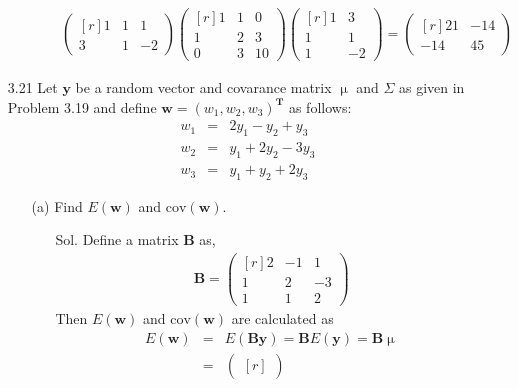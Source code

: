 \documentclass[12pt]{article} %
\begin{document}
\begin{enumerate}
\begin{enumerate}
\begin{enumerate}
\begin{eqnarray*}
\begin{pmatrix}[r]
				1 & 1 &  1 \\
				3 & 1 & 		  -2 		 	
		 	\end{pmatrix}		 		
			\begin{pmatrix}[r]
				1 & 1 & 0 \\
				1 & 2 & 3 \\
				0 & 3 & 10 
			\end{pmatrix}
			\begin{pmatrix}[r]
				1 &  3 \\
				1 &  1 \\
				1 & 		 -2  
			\end{pmatrix}
			=
			\begin{pmatrix}[r]
				 21 & 		   -14 \\
					   -14  &  45				
			\end{pmatrix}					
		 	\end{eqnarray*}
		 \end{enumerate}							
	\end{enumerate}	
\item[3.21] Let $\mathbf{y}$ be a random vector and 
covarance matrix $\upmu$ and $\Sigma$ as given in Problem 3.19 
and define $\mathbf{w}=(w_{1}, w_{2}, w_{3})^\mathbf{T}$
as follows: 
	\begin{eqnarray*}
		w_{1}&=&2y_{1}-y_{2}+y_{3} \\
		w_{2}&=&y_{1}+2y_{2}-3y_{3} \\
		w_{3}&=&y_{1}+y_{2}+2y_{3}
	\end{eqnarray*}
	\begin{enumerate}
		\item[(a)] Find $E(\mathbf{w})$ and $\mathrm{cov}(\mathbf{w})$.
			\begin{enumerate}
				\item[Sol.] Define a matrix $\mathbf{B}$ as, 
					\begin{eqnarray*}
						\mathbf{B}=
						\begin{pmatrix}[r]
							2 & -1 &  1 \\
							1 &  2 & -3 \\
							1 &  1 &  2
						\end{pmatrix}
					\end{eqnarray*}
				Then $E(\mathbf{w})$ and $\mathrm{cov}(\mathbf{w})$
				are calculated as
				\begin{eqnarray*}
				  E(\mathbf{w})&=&E(\mathbf{By})=\mathbf{B}E(\mathbf{y})=\mathbf{B}\upmu\\
				  &=&
				  \begin{pmatrix}[r]

\end{pmatrix}
\end{eqnarray*}
\end{enumerate}
\end{enumerate}
\end{enumerate}
\end{document}
